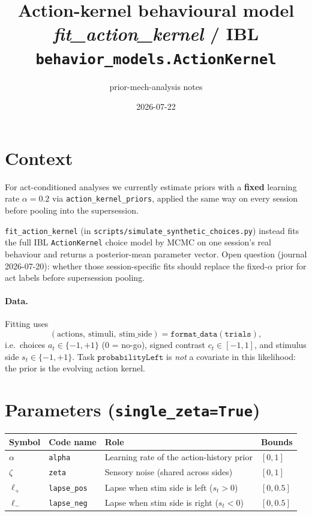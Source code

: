 \documentclass[11pt]{article}
\title{Action-kernel behavioural model\\
\large\textit{fit\_action\_kernel} / IBL \texttt{behavior\_models.ActionKernel}}
\author{prior-mech-analysis notes}
\date{2026-07-22}
\begin{document}
\maketitle

\section{Context}

For act-conditioned analyses we currently estimate priors with a
\textbf{fixed} learning rate \(\alpha = 0.2\) via
\texttt{action\_kernel\_priors}, applied the same way on every session
before pooling into the supersession.

\texttt{fit\_action\_kernel} (in
\texttt{scripts/simulate\_synthetic\_choices.py}) instead fits the full
IBL \texttt{ActionKernel} choice model by MCMC on one session's real
behaviour and returns a posterior-mean parameter vector. Open question
(journal 2026-07-20): whether those session-specific fits should replace
the fixed-\(\alpha\) prior for act labels before supersession pooling.

\paragraph{Data.} Fitting uses
\[
(\text{actions},\ \text{stimuli},\ \text{stim\_side})
= \texttt{format\_data}(\texttt{trials}),
\]
i.e.\ choices \(a_t\in\{-1,+1\}\) (0 = no-go), signed contrast
\(c_t\in[-1,1]\), and stimulus side \(s_t\in\{-1,+1\}\).
Task \(\texttt{probabilityLeft}\) is \emph{not} a covariate in this
likelihood: the prior is the evolving action kernel.

\section{Parameters (\texttt{single\_zeta=True})}

\begin{center}
\begin{tabular}{@{}llll@{}}
\toprule
Symbol & Code name & Role & Bounds \\
\midrule
\(\alpha\) & \texttt{alpha} & Learning rate of the action-history prior & \([0,1]\) \\
\(\zeta\) & \texttt{zeta} & Sensory noise (shared across sides) & \([0,1]\) \\
\(\ell_+\) & \texttt{lapse\_pos} & Lapse when stim side is left (\(s_t>0\)) & \([0,0.5]\) \\
\(\ell_-\) & \texttt{lapse\_neg} & Lapse when stim side is right (\(s_t<0\)) & \([0,0.5]\) \\
\bottomrule
\end{tabular}
\end{center}
\end{document}
